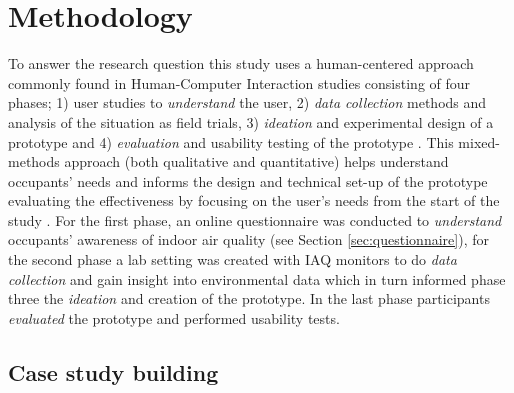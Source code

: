 \section{Methodology}
\label{sec:methodology}

To answer the research question this study uses a human-centered approach commonly found in Human-Computer Interaction studies consisting of four phases; 1) user studies to \textit{understand} the user, 2) \textit{data collection} methods and analysis of the situation as field trials, 3) \textit{ideation} and experimental design of a prototype and 4) \textit{evaluation} and usability testing of the prototype \cite{jonathan_lazar_research_2017, zimmerman_research_2007}. This mixed-methods approach (both qualitative and quantitative)  helps understand occupants' needs and informs the design and technical set-up of the prototype evaluating the effectiveness by focusing on the user's needs from the start of the study \cite{rogers_moving_2017}. For the first phase, an online questionnaire was conducted to \textit{understand} occupants' awareness of indoor air quality (see Section \ref{sec:questionnaire}), for the second phase a lab setting was created with IAQ monitors to do \textit{data collection} and gain insight into environmental data which in turn informed phase three the \textit{ideation} and creation of the prototype. In the last phase participants \textit{evaluated} the prototype and performed usability tests.

\subsection{Case study building}


